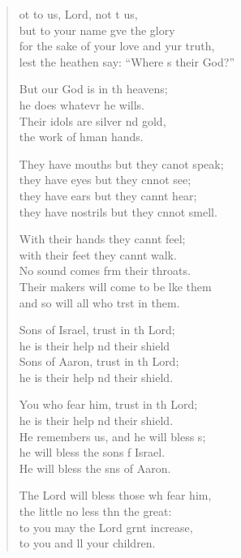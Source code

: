 \settowidth{\versewidth}{for the sake of your love and your truth, *}
\begin{verse}%
  \begin{patverse}
ot to us, Lord, not t us,\Med\\
but to your name gve the glory\\
for the sake of your love and yur truth,\Med\\
lest the heathen say: “Where s their God?”

But our God is in th heavens;\Med\\
he does whatevr he wills.\\
Their idols are silver nd gold,\Med\\
the work of hman hands.

They have mouths but they canot speak;\Med\\
they have eyes but they cnnot see;\\
they have ears but they cannt hear;\Med\\
they have nostrils but they cnnot smell.

With their hands they cannt feel;\Flex\\
with their feet they cannt walk.\Med\\
No sound comes frm their throats.\\
Their makers will come to be l\pointup{\i}ke them\Med\\
and so will all who trst in them.

Sons of Israel, trust in th Lord;\Med\\
he is their help nd their shield\\
Sons of Aaron, trust in th Lord;\Med\\
he is their help nd their shield.

You who fear him, trust in th Lord;\Med\\
he is their help nd their shield.\\
He remembers us, and he will bless s;\Flex\\
he will bless the sons f Israel.\Med\\
He will bless the sns of Aaron.

The Lord will bless those wh fear him,\Med\\
the little no less thn the great:\\
to you may the Lord grnt increase,\Med\\
to you and ll your children.


\end{patverse}
\end{verse}
